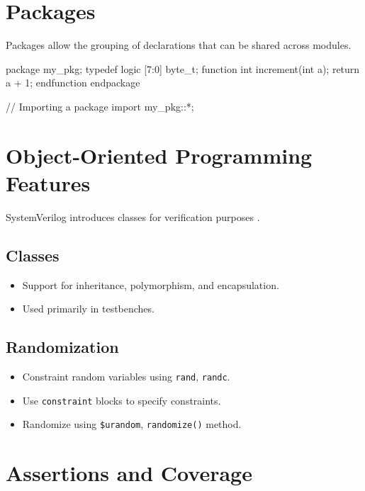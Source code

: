 \section{Packages}
Packages allow the grouping of declarations that can be shared across modules.
\begin{verilogcode}
package my_pkg;
    typedef logic [7:0] byte_t;
    function int increment(int a);
        return a + 1;
    endfunction
endpackage

// Importing a package
import my_pkg::*;
\end{verilogcode}

\section{Object-Oriented Programming Features}
SystemVerilog introduces classes for verification purposes \cite{stapko2008advanced}.

\subsection{Classes}
\begin{itemize}
    \item Support for inheritance, polymorphism, and encapsulation.
    \item Used primarily in testbenches.
\end{itemize}

\subsection{Randomization}
\begin{itemize}
    \item Constraint random variables using \texttt{rand}, \texttt{randc}.
    \item Use \texttt{constraint} blocks to specify constraints.
    \item Randomize using \texttt{\$urandom}, \texttt{randomize()} method.
\end{itemize}

\section{Assertions and Coverage}

